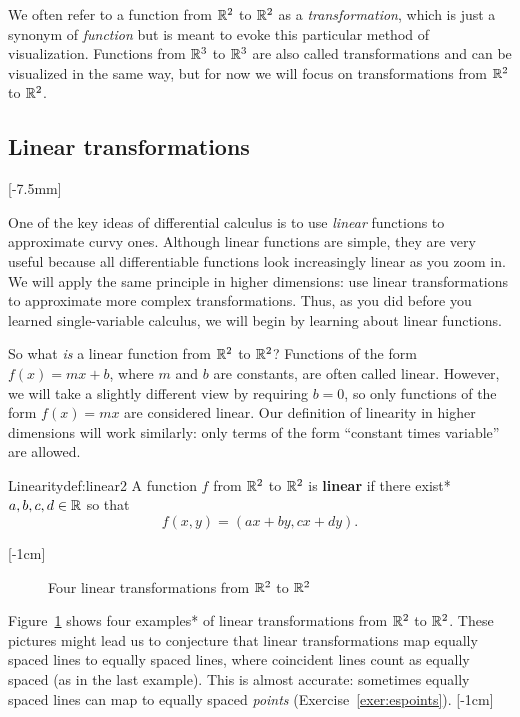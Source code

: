 \documentclass[svgnames]{report}
\begin{document}
We often refer to a function from $\mathbb{R}^2$ to $\mathbb{R}^2$ as a
\textit{transformation}, which is just a synonym of \textit{function}
but is meant to evoke this particular method of
visualization. Functions from $\mathbb{R}^3$ to $\mathbb{R}^3$ are also called
transformations and can be visualized in the same way, but for now we
will focus on transformations from $\mathbb{R}^2$ to
$\mathbb{R}^2$.

\subsection{Linear transformations}

[-7.5mm]

\label{subsec:lintrans} 

One of the key ideas of differential calculus is to use
\textit{linear} functions to approximate curvy ones. Although linear
functions are simple, they are very useful because all differentiable
functions look increasingly linear as you zoom in. We will apply the
same principle in higher dimensions: use linear transformations to
approximate more complex transformations. Thus, as you did before you
learned single-variable calculus, we will begin by learning about
linear functions. 

So what \textit{is} a linear function from $\mathbb{R}^2$ to $\mathbb{R}^2$? 
Functions of the form 
$f(x) = mx + b$, where $m$ and $b$ are constants, are often called
linear. However, we will take a slightly different view by requiring
$b = 0$, so only functions of the form $f(x) = mx$ are considered
linear. Our definition of linearity in higher dimensions will work
similarly: only terms of the form ``constant times variable'' are
allowed. 

\begin{defn}{Linearity}{def:linear2}
  A function $f$ from $\mathbb{R}^2$ to $\mathbb{R}^2$ is \textbf{linear} if there exist*
  $a,b,c,d \in \mathbb{R}$ so that 
  \[
    f(x,y) = (ax + by , cx + dy). 
  \]
\end{defn}
[-1cm]

\begin{figure}[h!]

\caption{Four linear transformations from $\mathbb{R}^2$ to $\mathbb{R}^2$ \label{fig:four_trans}}
\end{figure}

Figure~\ref{fig:four_trans} shows four examples* of linear
transformations from $\mathbb{R}^2$ to $\mathbb{R}^2$. These pictures might lead us to
conjecture that linear transformations map equally spaced lines to
equally spaced lines, where coincident lines count as equally spaced
(as in the last example). This is almost accurate: sometimes equally
spaced lines can map to equally spaced \textit{points}
(Exercise~\ref{exer:espoints}). [-1cm]
\end{document}
